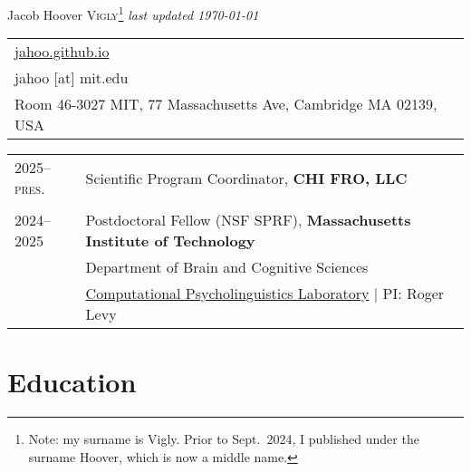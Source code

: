 \documentclass[11pt,a4paper]{article}
\begin{document}
\pagestyle{empty}
{\Huge{Jacob Hoover \scshape{Vigly}}\footnote{%
Note: my surname is Vigly. Prior to Sept.\ 2024, I published under the surname Hoover, which is now a middle name.%
}}
\hfill{}{\small\color{lightgray}\itshape last updated \monthyeardate\today}

\begin{tabular}{%
  l
}
  \href{https://jahoo.github.io}{jahoo.github.io}\\
  jahoo [at] mit.edu\\
  Room 46-3027 MIT, 77 Massachusetts Ave, Cambridge MA 02139, USA\\
\end{tabular}

\vspace*{5pt}


\begin{longtable}{p{1.7cm}|p{15cm}}
  \textsc{2025--pres.}%
    &Scientific Program Coordinator,
    \textbf{CHI FRO, LLC}\\
  \multicolumn{2}{c}{}\\
  \textsc{2024--2025}%
    &Postdoctoral Fellow (NSF SPRF),
    \textbf{Massachusetts Institute of Technology}\\
    &\quad{}Department of Brain and Cognitive Sciences\\
    &\quad{}\href{https://cpl.mit.edu}{Computational Psycholinguistics Laboratory} | PI: Roger Levy\\
  \end{longtable}

\section{Education}
\end{document}
